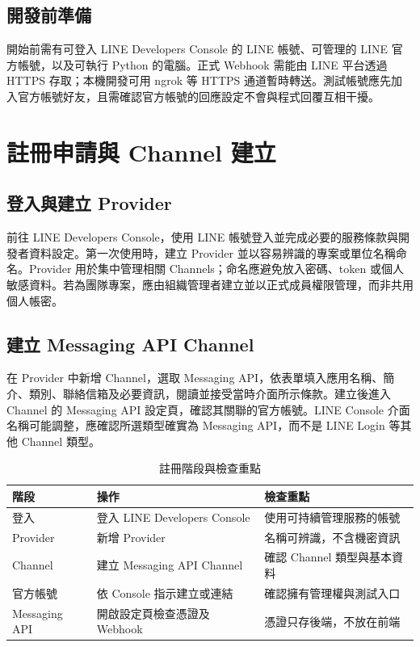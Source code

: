 \documentclass[12pt,a4paper,openany]{book}
\begin{document}
\section{開發前準備}
開始前需有可登入 LINE Developers Console 的 LINE 帳號、可管理的 LINE 官方帳號，以及可執行 Python 的電腦。正式 Webhook 需能由 LINE 平台透過 HTTPS 存取；本機開發可用 ngrok 等 HTTPS 通道暫時轉送。測試帳號應先加入官方帳號好友，且需確認官方帳號的回應設定不會與程式回覆互相干擾。

\chapter{註冊申請與 Channel 建立}
\section{登入與建立 Provider}
前往 LINE Developers Console，使用 LINE 帳號登入並完成必要的服務條款與開發者資料設定。第一次使用時，建立 Provider 並以容易辨識的專案或單位名稱命名。Provider 用於集中管理相關 Channels；命名應避免放入密碼、token 或個人敏感資料。若為團隊專案，應由組織管理者建立並以正式成員權限管理，而非共用個人帳密。

\section{建立 Messaging API Channel}
在 Provider 中新增 Channel，選取 Messaging API，依表單填入應用名稱、簡介、類別、聯絡信箱及必要資訊，閱讀並接受當時介面所示條款。建立後進入 Channel 的 Messaging API 設定頁，確認其關聯的官方帳號。LINE Console 介面名稱可能調整，應確認所選類型確實為 Messaging API，而不是 LINE Login 等其他 Channel 類型。

\begin{table}[htbp]
\centering
\caption{註冊階段與檢查重點}
\label{tab:setup}
\begin{tabularx}{\textwidth}{>{\raggedright\arraybackslash}p{2.7cm}XX}
\toprule
階段 & 操作 & 檢查重點 \\
\midrule
登入 & 登入 LINE Developers Console & 使用可持續管理服務的帳號 \\
Provider & 新增 Provider & 名稱可辨識，不含機密資訊 \\
Channel & 建立 Messaging API Channel & 確認 Channel 類型與基本資料 \\
官方帳號 & 依 Console 指示建立或連結 & 確認擁有管理權與測試入口 \\
Messaging API & 開啟設定頁檢查憑證及 Webhook & 憑證只存後端，不放在前端 \\
\bottomrule
\end{tabularx}
\end{table}
\end{document}
